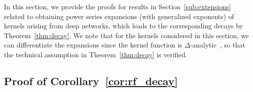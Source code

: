 
In this section, we provide the proofs for results in Section~\ref{sub:extensions} related to obtaining power series expansions (with generalized exponents) of kernels arising from deep networks, which leads to the corresponding decays by Theorem~\ref{thm:decay}.
We note that for the kernels considered in this section, we can differentiate the expansions since the kernel function is $\Delta$-analytic~\citep[see][Theorem 7]{chen2020deep}, so that the technical assumption in Theorem~\ref{thm:decay} is verified.

\subsection{Proof of Corollary~\ref{cor:rf_decay}} %
\label{sub:rf_decay_proof}

